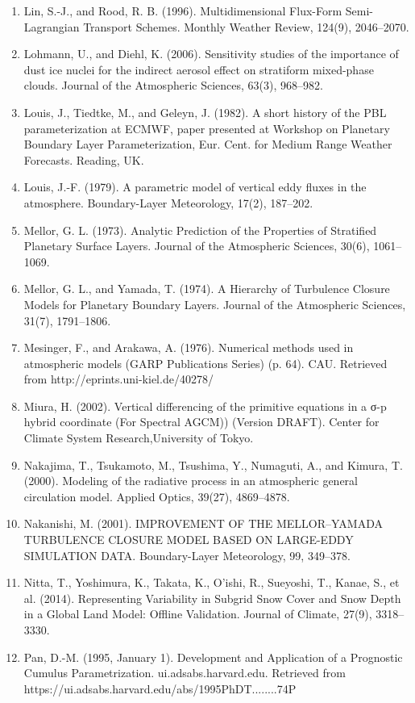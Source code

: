 \begin{enumerate}
\item Lin, S.-J., and Rood, R. B. (1996). Multidimensional Flux-Form Semi-Lagrangian Transport Schemes. Monthly Weather Review, 124(9), 2046–2070.
\item Lohmann, U., and Diehl, K. (2006). Sensitivity studies of the importance of dust ice nuclei for the indirect aerosol effect on stratiform mixed-phase clouds. Journal of the Atmospheric Sciences, 63(3), 968–982.
\item Louis, J., Tiedtke, M., and Geleyn, J. (1982). A short history of the PBL parameterization at ECMWF, paper presented at Workshop on Planetary Boundary Layer Parameterization, Eur. Cent. for Medium Range Weather Forecasts. Reading, UK.
\item Louis, J.-F. (1979). A parametric model of vertical eddy fluxes in the atmosphere. Boundary-Layer Meteorology, 17(2), 187–202.
\item Mellor, G. L. (1973). Analytic Prediction of the Properties of Stratified Planetary Surface Layers. Journal of the Atmospheric Sciences, 30(6), 1061–1069.
\item Mellor, G. L., and Yamada, T. (1974). A Hierarchy of Turbulence Closure Models for Planetary Boundary Layers. Journal of the Atmospheric Sciences, 31(7), 1791–1806.
\item Mesinger, F., and Arakawa, A. (1976). Numerical methods used in atmospheric models (GARP Publications Series) (p. 64). CAU. Retrieved from http://eprints.uni-kiel.de/40278/
\item Miura, H. (2002). Vertical differencing of the primitive equations in a σ-p hybrid coordinate (For Spectral AGCM)) (Version DRAFT). Center for Climate System Research,University of Tokyo.
\item Nakajima, T., Tsukamoto, M., Tsushima, Y., Numaguti, A., and Kimura, T. (2000). Modeling of the radiative process in an atmospheric general circulation model. Applied Optics, 39(27), 4869–4878.
\item Nakanishi, M. (2001). IMPROVEMENT OF THE MELLOR–YAMADA TURBULENCE CLOSURE MODEL BASED ON LARGE-EDDY SIMULATION DATA. Boundary-Layer Meteorology, 99, 349–378.
\item Nitta, T., Yoshimura, K., Takata, K., O’ishi, R., Sueyoshi, T., Kanae, S., et al. (2014). Representing Variability in Subgrid Snow Cover and Snow Depth in a Global Land Model: Offline Validation. Journal of Climate, 27(9), 3318–3330.
\item Pan, D.-M. (1995, January 1). Development and Application of a Prognostic Cumulus Parametrization. ui.adsabs.harvard.edu. Retrieved from https://ui.adsabs.harvard.edu/abs/1995PhDT........74P

\end{enumerate}
